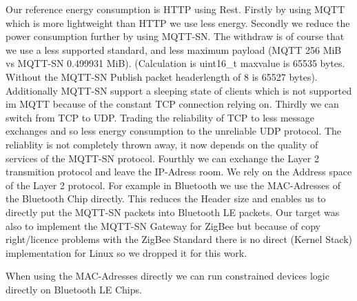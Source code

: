 Our reference energy consumption is HTTP using Rest.
Firstly by using MQTT which is more lightweight than HTTP we use less energy.
Secondly we reduce the power consumption further by using MQTT-SN.
The withdraw is of course that we use a less supported standard, and less maximum payload (MQTT 256 MiB vs MQTT-SN 0.499931 MiB).
(Calculation is uint16\_t maxvalue is 65535 bytes. Without the MQTT-SN Publish packet headerlength of 8 is 65527 bytes).
Additionally MQTT-SN support a sleeping state of clients which is not supported im MQTT because of the constant TCP connection relying on.
Thirdly we can switch from TCP to UDP. Trading the reliability of TCP to less message exchanges and so less energy consumption to the unreliable UDP protocol.
The reliablity is not completely thrown away, it now depends on the quality of services of the MQTT-SN protocol.
Fourthly we can exchange the Layer 2 transmition protocol and leave the IP-Adress room. We rely on the Address space of the Layer 2 protocol.
For example in Bluetooth we use the MAC-Adresses of the Bluetooth Chip directly. This reduces the Header size and enables us to directly put the MQTT-SN packets into Bluetooth LE packets.
Our target was also to implement the MQTT-SN Gateway for ZigBee but because of copy right/licence problems with the ZigBee Standard there is no direct (Kernel Stack) implementation for Linux so we dropped it for this work.

When using the MAC-Adresses directly we can run constrained devices logic directly on Bluetooth LE Chips.

